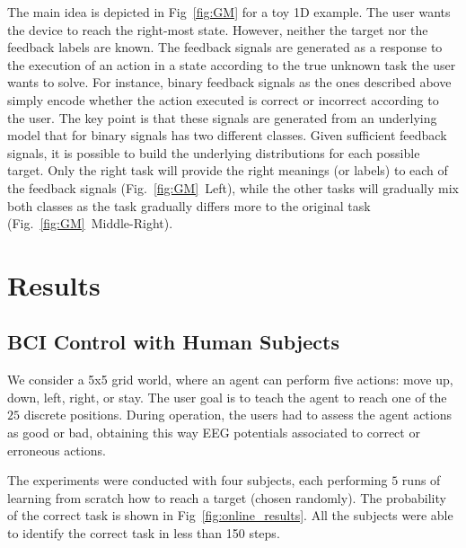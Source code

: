 \documentclass[conference]{IEEEtran}
\begin{document}
The main idea is depicted in Fig~\ref{fig:GM} for a toy 1D example. The user wants the device to reach the right-most state. However, neither the target nor the feedback labels are known. The feedback signals are generated as a response to the execution of an action in a state according to the true unknown task the user wants to solve.  For instance, binary feedback signals as the ones described above simply encode whether the action executed is correct or incorrect according to the user.  The key point is that  these signals are generated from an underlying model that for binary signals has two different classes. Given sufficient feedback signals, it is possible to build the underlying distributions for each possible target. Only the right task will provide the right meanings (or labels) to each of the feedback signals (Fig.~\ref{fig:GM}~Left), while the other tasks will gradually mix both classes as the task gradually differs more to the original task (Fig.~\ref{fig:GM}~Middle-Right).

\section{Results}

\subsection{BCI Control with Human Subjects} 
We consider a 5x5 grid world, where an agent can perform five actions: move up, down, left, right, or stay. The user goal is to teach the agent to reach one of the $25$ discrete positions. During operation, the users had to assess the agent actions as good or bad, obtaining this way EEG potentials associated to correct or erroneous actions. 

The experiments were conducted with four subjects, each performing $5$ runs of learning from scratch how to reach a target (chosen randomly). The probability of the correct task is shown in Fig~\ref{fig:online_results}. All the subjects were able to identify the correct task in less than 150 steps.
\end{document}
